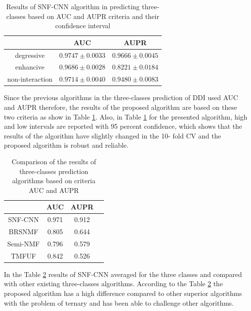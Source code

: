 \documentclass{bmcart}
\begin{document}
\begin{table}[h!]
\centering 
\begin{tabular}{|c|c|c|}
\hline
& AUC & AUPR\\
\hline
degressive	& $0.9747 \pm 0.0033$ & $0.9666 \pm 0.0045$\\
\hline
enhancive  & $0.9686 \pm 0.0028$ & $0.8221 \pm 0.0184$\\
\hline
non-interaction & $0.9714 \pm 0.0040$ & $0.9480 \pm 0.0083$\\
\hline
\end{tabular}
\newline
	\caption{Results of SNF-CNN algorithm in predicting three-classes based on AUC and AUPR criteria and their confidence interval}
	\label{SNF-CNNresult}
\end{table}

Since the previous algorithms in the three-classes prediction of DDI used AUC and AUPR therefore, the results of the proposed algorithm are based on these two criteria as show in Table \ref{SNF-CNNresult}. Also, in Table \ref{SNF-CNNresult} for the presented algorithm, high and low intervals are reported with 95 percent confidence, which shows that the results of the algorithm have slightly changed in the 10- fold CV and the proposed algorithm is robust and reliable.

\begin{table}[h!]
\centering 
\begin{tabular}{|c|c|c|c|}
\hline
& AUC	& AUPR \\
\hline
SNF-CNN	& 0.971 & 0.912\\
\hline
BRSNMF\cite{shi2019detecting}  & 0.805 & 0.644\\
\hline
Semi-NMF \cite{yu2018predicting} & 0.796 & 0.579\\
\hline
TMFUF\cite{shi2018tmfuf}   & 0.842  & 0.526\\
\hline
\end{tabular}
\newline 
	\caption{Comparison of the results of three-classes prediction algorithms based on criteria AUC and AUPR}
	\label{AUCAUPR}
\end{table}

In the Table \ref{AUCAUPR} results of SNF-CNN averaged for the three classes and compared with other existing three-classes algorithms. According to the Table \ref{AUCAUPR} the proposed algorithm has a high difference compared to other superior algorithms with the problem of ternary and has been able to challenge other algorithms.
\end{document}

